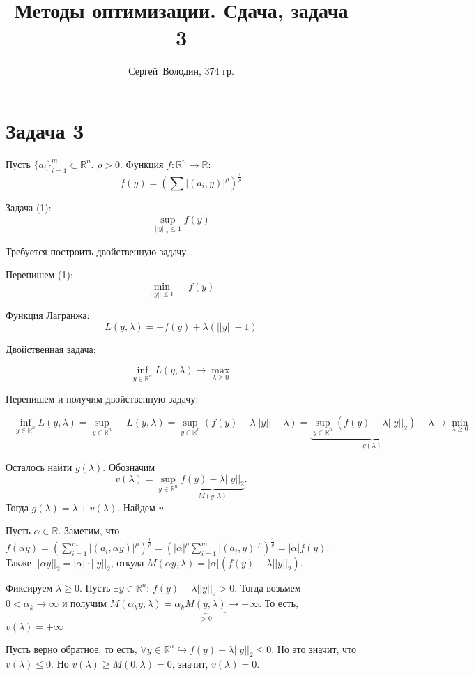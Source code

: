 \documentclass[a4paper]{article}
\title{Методы оптимизации. Сдача, задача 3}
\author{Сергей~Володин, 374 гр.}
\begin{document}
\maketitle
\section*{Задача 3}
Пусть $\{a_i\}_{i=1}^m\subset \mathbb{R}^n$. $\rho > 0$. Функция $f\colon \mathbb{R}^n\to\mathbb{R}$:
$$f(y)=\left(\sum\limits|(a_i,y)|^\rho\right)^{\frac{1}{\rho}}$$

Задача (1):
$$\sup\limits_{||y||_2\leqslant 1} f(y)$$

Требуется построить двойственную задачу.

Перепишем (1):
$$\min\limits_{||y||\leqslant 1} -f(y)$$

Функция Лагранжа:
$$L(y,\lambda)=-f(y)+\lambda(||y||-1)$$

Двойственная задача:

$$\inf\limits_{y\in\mathbb{R}^n} L(y,\lambda)\to\max\limits_{\lambda \geqslant 0}$$

Перепишем и получим двойственную задачу:

$$-\inf\limits_{y\in\mathbb{R}^n} L(y,\lambda)=\sup\limits_{y\in\mathbb{R}^n}-L(y,\lambda)=\sup\limits_{y\in\mathbb{R}^n}(f(y)-\lambda ||y||+\lambda)=\underbrace{\sup\limits_{y\in\mathbb{R}^n}(f(y)-\lambda||y||_2)+\lambda}_{g(\lambda)}\to\min\limits_{\lambda\geqslant 0}$$

Осталось найти $g(\lambda)$. Обозначим $$v(\lambda)=\sup\limits_{y\in\mathbb{R}^n}\underbrace{f(y)-\lambda||y||_2}_{M(y,\lambda)}.$$
Тогда $g(\lambda)=\lambda+v(\lambda)$. Найдем $v$.

Пусть $\alpha\in\mathbb{R}$. Заметим, что $f(\alpha y)=\left(\sum\limits_{i=1}^m|(a_i,\alpha y)|^\rho\right)^{\frac{1}{\rho}}=\left(|\alpha|^\rho\sum\limits_{i=1}^m|(a_i,y)|^\rho\right)^{\frac{1}{\rho}}=|\alpha|f(y)$. Также $||\alpha y||_2=|\alpha|\cdot||y||_2$, откуда
$M(\alpha y,\lambda)=|\alpha|(f(y)-\lambda ||y||_2)$.

Фиксируем $\lambda\geqslant 0$. Пусть $\exists y\in\mathbb{R}^n\colon\, f(y)-\lambda ||y||_2>0$. Тогда возьмем $0<\alpha_k\to\infty$ и получим $M(\alpha_k y,\lambda)=\alpha_k \underbrace{M(y,\lambda)}_{>0}\to+\infty$. То есть, $v(\lambda)=+\infty$

Пусть верно обратное, то есть, $\forall y\in\mathbb{R}^n\hookrightarrow f(y)-\lambda||y||_2\leqslant 0$. Но это значит, что $v(\lambda)\leqslant 0$. Но $v(\lambda)\geqslant M(0,\lambda)=0$, значит, $v(\lambda)=0$.
\end{document}
